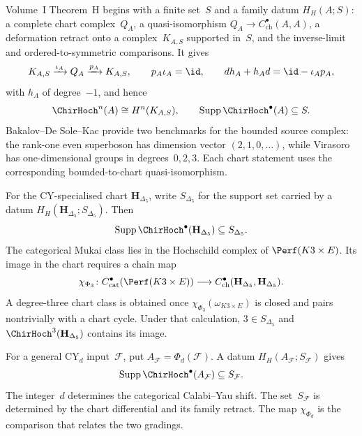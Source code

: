 \begin{remark}
\label{rem:hochcalc-theoremH-CY3-scope}
Volume~I Theorem~H begins with a finite set~$S$ and a family datum
$H_H(A;S)$: a complete chart complex~$Q_A$, a quasi-isomorphism
$Q_A\to C^\bullet_{\mathrm{ch}}(A,A)$, a deformation retract onto a
complex~$K_{A,S}$ supported in~$S$, and the inverse-limit and
ordered-to-symmetric comparisons.  It gives
\[
 K_{A,S}\xrightarrow{\iota_A}Q_A\xrightarrow{p_A}K_{A,S},
 \qquad
 p_A\iota_A=\id,
 \qquad
 d h_A+h_A d=\id-\iota_Ap_A,
\]
with $h_A$ of degree~$-1$, and hence
\[
 \ChirHoch^n(A)\cong H^n(K_{A,S}),
 \qquad
 \operatorname{Supp}\ChirHoch^\bullet(A)\subseteq S.
\]
Bakalov--De Sole--Kac provide two benchmarks for the bounded source
complex: the rank-one even superboson has dimension vector
$(2,1,0,\ldots)$, while Virasoro has one-dimensional groups in
degrees~$0,2,3$.  Each chart statement uses the corresponding
bounded-to-chart quasi-isomorphism.

For the CY-specialised chart $\mathbf H_{\Delta_5}$, write
$S_{\Delta_5}$ for the support set carried by a datum
$H_H(\mathbf H_{\Delta_5};S_{\Delta_5})$.  Then
\begin{equation}
\label{eq:hochcalc-CY3-scope}
 \operatorname{Supp}\ChirHoch^\bullet(\mathbf H_{\Delta_5})
 \subseteq S_{\Delta_5}.
\end{equation}
The categorical Mukai class lies in the Hochschild complex of
$\Perf(K3\times E)$.  Its image in the chart requires a chain map
\[
 \chi_{\Phi_3}\colon
 C^\bullet_{\mathrm{cat}}(\Perf(K3\times E))
 \longrightarrow
 C^\bullet_{\mathrm{ch}}(\mathbf H_{\Delta_5},
                         \mathbf H_{\Delta_5}).
\]
A degree-three chart class is obtained once
$\chi_{\Phi_3}(\omega_{K3\times E})$ is closed and pairs nontrivially
with a chart cycle.  Under that calculation,
$3\in S_{\Delta_5}$ and
$\ChirHoch^3(\mathbf H_{\Delta_5})$ contains its image.

For a general CY$_d$ input~$\mathcal F$, put
$A_{\mathcal F}=\Phi_d(\mathcal F)$.  A datum
$H_H(A_{\mathcal F};S_{\mathcal F})$ gives
\begin{equation}
\label{eq:hochcalc-CYd-scope-general}
 \operatorname{Supp}\ChirHoch^\bullet(A_{\mathcal F})
 \subseteq S_{\mathcal F}.
\end{equation}
The integer~$d$ determines the categorical Calabi--Yau shift.  The
set~$S_{\mathcal F}$ is determined by the chart differential and its
family retract.  The map $\chi_{\Phi_d}$ is the comparison that relates
the two gradings.
\end{remark}

